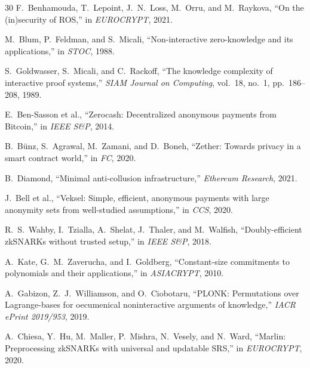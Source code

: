 \documentclass[11pt,a4paper]{article}
\begin{document}
\begin{thebibliography}{30}
F.~Benhamouda, T.~Lepoint, J.~N.~Loss, M.~Orru, and M.~Raykova, ``On the (in)security of ROS,'' in \emph{EUROCRYPT}, 2021.

M.~Blum, P.~Feldman, and S.~Micali, ``Non-interactive zero-knowledge and its applications,'' in \emph{STOC}, 1988.

S.~Goldwasser, S.~Micali, and C.~Rackoff, ``The knowledge complexity of interactive proof systems,'' \emph{SIAM Journal on Computing}, vol.~18, no.~1, pp.~186--208, 1989.

E.~Ben-Sasson et al., ``Zerocash: Decentralized anonymous payments from Bitcoin,'' in \emph{IEEE S\&P}, 2014.

B.~B\"unz, S.~Agrawal, M.~Zamani, and D.~Boneh, ``Zether: Towards privacy in a smart contract world,'' in \emph{FC}, 2020.

B.~Diamond, ``Minimal anti-collusion infrastructure,'' \emph{Ethereum Research}, 2021.

J.~Bell et al., ``Veksel: Simple, efficient, anonymous payments with large anonymity sets from well-studied assumptions,'' in \emph{CCS}, 2020.

R.~S.~Wahby, I.~Tzialla, A.~Shelat, J.~Thaler, and M.~Walfish, ``Doubly-efficient zkSNARKs without trusted setup,'' in \emph{IEEE S\&P}, 2018.

A.~Kate, G.~M.~Zaverucha, and I.~Goldberg, ``Constant-size commitments to polynomials and their applications,'' in \emph{ASIACRYPT}, 2010.

A.~Gabizon, Z.~J.~Williamson, and O.~Ciobotaru, ``PLONK: Permutations over Lagrange-bases for oecumenical noninteractive arguments of knowledge,'' \emph{IACR ePrint 2019/953}, 2019.

A.~Chiesa, Y.~Hu, M.~Maller, P.~Mishra, N.~Vesely, and N.~Ward, ``Marlin: Preprocessing zkSNARKs with universal and updatable SRS,'' in \emph{EUROCRYPT}, 2020.

\end{thebibliography}
\end{document}
